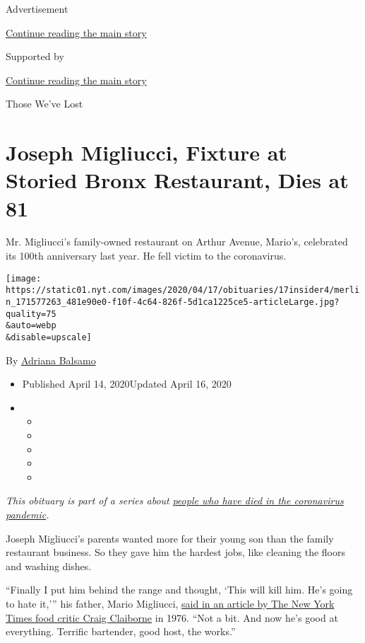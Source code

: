 Advertisement

\protect\hyperlink{after-top}{Continue reading the main story}

Supported by

\protect\hyperlink{after-sponsor}{Continue reading the main story}

Those We've Lost

\hypertarget{joseph-migliucci-fixture-at-storied-bronx-restaurant-dies-at-81}{%
\section{Joseph Migliucci, Fixture at Storied Bronx Restaurant, Dies at
81}\label{joseph-migliucci-fixture-at-storied-bronx-restaurant-dies-at-81}}

Mr. Migliucci's family-owned restaurant on Arthur Avenue, Mario's,
celebrated its 100th anniversary last year. He fell victim to the
coronavirus.

\texttt{[image: https://static01.nyt.com/images/2020/04/17/obituaries/17insider4/merlin\_171577263\_481e90e0-f10f-4c64-826f-5d1ca1225ce5-articleLarge.jpg?quality=75\\\&auto=webp\\\&disable=upscale]}

By \href{https://www.nytimes.com/by/adriana-balsamo}{Adriana Balsamo}

\begin{itemize}
\item
  Published April 14, 2020Updated April 16, 2020
\item
  \begin{itemize}
  \item
  \item
  \item
  \item
  \item
  \end{itemize}
\end{itemize}

\emph{This obituary is part of a series about}
\href{https://www.nytimes.com/series/people-who-have-died-of-the-coronavirus}{\emph{people
who have died in the coronavirus pandemic}}\emph{.}

Joseph Migliucci's parents wanted more for their young son than the
family restaurant business. So they gave him the hardest jobs, like
cleaning the floors and washing dishes.

``Finally I put him behind the range and thought, `This will kill him.
He's going to hate it,''' his father, Mario Migliucci,
\href{https://www.nytimes.com/1976/09/15/archives/from-a-family-of-chefs-a-feast-of-robust-neapolitan-food.html}{said
in an article by The New York Times food critic Craig Claiborne} in
1976. ``Not a bit. And now he's good at everything. Terrific bartender,
good host, the works.''


